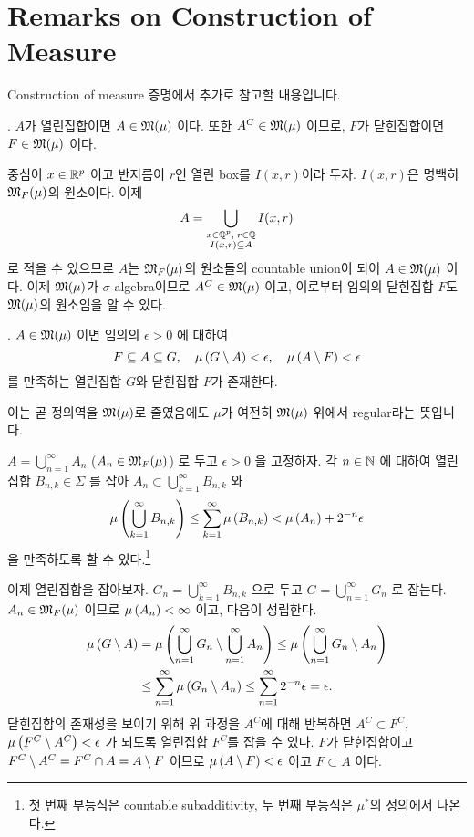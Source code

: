 \section*{Remarks on Construction of Measure}

Construction of measure 증명에서 추가로 참고할 내용입니다.

\prop. \(A\)가 열린집합이면 \(A \in \mathfrak{M}(\mu)\) 이다. 또한 \(A^C \in \mathfrak{M}(\mu)\) 이므로, \(F\)가 닫힌집합이면 \(F \in \mathfrak{M}(\mu)\) 이다.

\pf 중심이 \(x\in \mathbb{R}^p\) 이고 반지름이 \(r\)인 열린 box를 \(I(x, r)\)이라 두자. \(I(x, r)\)은 명백히 \(\mathfrak{M}_F(\mu)\)의 원소이다. 이제
\[
    A = \bigcup_{\substack{x \in \mathbb{Q}^p, \; r \in \mathbb{Q} \\ I(x, r)\subseteq A}} I(x, r)
\]
로 적을 수 있으므로 \(A\)는 \(\mathfrak{M}_F(\mu)\)의 원소들의 countable union이 되어 \(A \in \mathfrak{M}(\mu)\) 이다. 이제 \(\mathfrak{M}(\mu)\)가 \(\sigma\)-algebra이므로 \(A^C\in \mathfrak{M}(\mu)\) 이고, 이로부터 임의의 닫힌집합 \(F\)도 \(\mathfrak{M}(\mu)\)의 원소임을 알 수 있다.

\prop. \(A \in \mathfrak{M}(\mu)\) 이면 임의의 \(\epsilon > 0\) 에 대하여
\[
    F \subseteq A \subseteq G, \quad \mu\left( G \setminus A \right) < \epsilon, \quad \mu\left( A \setminus F \right) < \epsilon
\]
를 만족하는 열린집합 \(G\)와 닫힌집합 \(F\)가 존재한다.

이는 곧 정의역을 \(\mathfrak{M}(\mu)\)로 줄였음에도 \(\mu\)가 여전히 \(\mathfrak{M}(\mu)\) 위에서 regular라는 뜻입니다.

\pf \(A = \bigcup_{n=1}^\infty A_n\) (\(A_n \in \mathfrak{M}_F(\mu)\)) 로 두고 \(\epsilon > 0\) 을 고정하자. 각 \(n \in \mathbb{N}\) 에 대하여 열린집합 \(B_{n, k} \in \Sigma\) 를 잡아 \(A_n \subset \bigcup_{k=1}^\infty B_{n, k}\) 와
\[
    \mu\left( \bigcup_{k=1}^{\infty} B_{n, k} \right) \leq \sum_{k=1}^{\infty} \mu\left( B_{n, k} \right) < \mu\left( A_n \right) + 2^{-n}\epsilon
\]
을 만족하도록 할 수 있다.\footnote{첫 번째 부등식은 countable subadditivity, 두 번째 부등식은 \(\mu^\ast\)의 정의에서 나온다.}

이제 열린집합을 잡아보자. \(G_n = \bigcup_{k=1}^{\infty} B_{n, k}\) 으로 두고 \(G = \bigcup_{n=1}^{\infty} G_n\) 로 잡는다. \(A_n \in \mathfrak{M}_F(\mu)\) 이므로 \(\mu\left( A_n \right) < \infty\) 이고, 다음이 성립한다.
\[
    \begin{aligned}
        \mu\left( G \setminus A \right) & = \mu\left( \bigcup_{n=1}^{\infty} G_n \setminus \bigcup_{n=1}^{\infty} A_n \right) \leq \mu\left( \bigcup_{n=1}^{\infty} G_n \setminus A_n \right) \\ &\leq \sum_{n=1}^{\infty} \mu\left( G_n \setminus A_n \right) \leq \sum_{n=1}^{\infty} 2^{-n}\epsilon = \epsilon.
    \end{aligned}
\]
닫힌집합의 존재성을 보이기 위해 위 과정을 \(A^C\)에 대해 반복하면 \(A^C \subset F^C\), \(\mu\left( F^C \setminus A^C \right) < \epsilon\) 가 되도록 열린집합 \(F^C\)를 잡을 수 있다. \(F\)가 닫힌집합이고 \(F^C \setminus A^C = F^C \cap A = A\setminus F\) 이므로 \(\mu\left( A \setminus F \right) < \epsilon\) 이고 \(F\subset A\) 이다.

